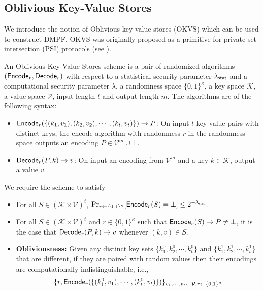 \subsection{Oblivious Key-Value Stores}\label{sec:prelim_okvs}
We introduce the notion of Oblivious key-value stores (OKVS) which can be used to construct DMPF. OKVS was originally proposed as a primitive for private set intersection (PSI) protocols (see \cite{cryptoeprint:2021/883,cryptoeprint:2022/320}). 
\begin{definition}\label{def:OKVS}
  An Oblivious Key-Value Stores scheme is a pair of randomized algorithms $({\sf Encode}_r,{\sf Decode}_r)$ with respect to a statistical security parameter $\lambda_{\sf stat}$ and a computational security parameter $\lambda$, a randomness space $\{0,1\}^\kappa$, a key space $\mathcal{K}$, a value space $\mathcal{V}$, input length $t$ and output length $m$. The algorithms are of the following syntax: 
  \begin{itemize}
    \item ${\sf Encode}_r(\{(k_1,v_1),(k_2,v_2),\cdots,(k_t,v_t)\})\rightarrow P$: On input $t$ key-value pairs with distinct keys, the encode algorithm with randomness $r$ in the randomness space outputs an encoding $P\in\mathcal{V}^m\cup\bot$.
    \item ${\sf Decode}_r(P,k)\rightarrow v$: On input an encoding from $\mathcal{V}^m$ and a key $k\in\mathcal{K}$, output a value $v$. 
  \end{itemize}
  We require the scheme to satisfy
  \begin{itemize}
    \item For all $S\in(\mathcal{K}\times\mathcal{V})^t$, $\Pr_{r\leftarrow\{0,1\}^\kappa}[{\sf Encode}_r(S)=\bot]\le 2^{-\lambda_{\sf stat}}$. 
    \item For all $S\in(\mathcal{K}\times \mathcal{V})^t$ and $r\in \{0,1\}^\kappa$ such that ${\sf Encode}_r(S)\rightarrow P\not=\bot$, it is the case that ${\sf Decode}_r(P,k)\rightarrow v$ whenever $(k,v)\in S$. 
    \item \textbf{Obliviousness: }Given any distinct key sets $\{k_1^0,k_2^0,\cdots,k_t^0\}$ and $\{k_1^1,k_2^1,\cdots,k_t^1\}$ that are different, if they are paired with random values then their encodings are computationally indistinguishable, i.e., 
  \begin{align*}
    &\{r, \Encode_r(\{(k_1^0,v_1),\cdots,(k_t^0,v_t)\})\}_{v_1,\cdots,v_t\leftarrow \mathcal{V},r\leftarrow\{0,1\}^\kappa}\\

\end{align*}
\end{itemize}
\end{definition}
